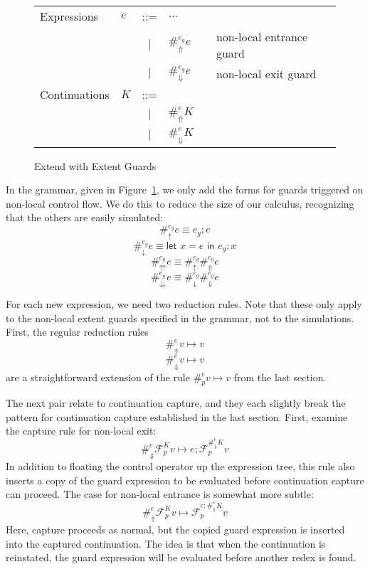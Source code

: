 \documentclass[11pt]{article}
\newcommand{\letin}[2]{\textsf{let }#1\textsf{ in }#2}
\newcommand\F{\mathcal{F}}
\begin{document}
\begin{figure}[H]
\caption{Extend with Extent Guards}
\label{fig:addGuards}

\begin{tabular}{llclll}
Expressions & $e$ & ::= & $\ldots$ &  \\
& & $|$ & $\#_\Uparrow^{e_g}e$ && non-local entrance guard \\
& & $|$ & $\#_\Downarrow^{e_g}e$ && non-local exit guard \\
Continuations & $K$ & ::= & \\
& & $|$ & $\#_{\Uparrow}^{e}K$ &&  \\
& & $|$ & $\#_{\Downarrow}^{e}K$ &&  \\
\end{tabular}
\end{figure}

In the grammar, given in Figure~\ref{fig:addGuards}, we only add the forms for guards triggered on non-local control flow.
We do this to reduce the size of our calculus, recognizing that the others are easily simulated:
$$\#_\uparrow^{e_g}e \equiv e_g; e$$
$$\#_\downarrow^{e_g}e \equiv \letin{x=e}{e_g; x}$$
$$\#_\upuparrows^{e_g}e \equiv \#_\uparrow^{e_g}\#_\Uparrow^{e_g}e$$
$$\#_\downdownarrows^{e_g}e \equiv \#_\downarrow^{e_g}\#_\Downarrow^{e_g}e$$


For each new expression, we need two reduction rules.
Note that these only apply to the non-local extent guards specified in the grammar, not to the simulations.
First, the regular reduction rules
$$\#_{\Uparrow}^{e}v \mapsto v$$
$$\#_{\Downarrow}^{e}v \mapsto v$$
are a straightforward extension of the rule $\#_{p}^{e}v \mapsto v$ from the last section.

The next pair relate to continuation capture, and they each slightly break the pattern for continuation capture established in the last section.
First, examine the capture rule for non-local exit:
$$\#_{\Downarrow}^{e}\F_p^K v \mapsto e;\F_p^{\#_\Downarrow^{e}K}v$$
In addition to floating the control operator up the expression tree, this rule also inserts a copy of the guard expression to be evaluated before continuation capture can proceed.
The case for non-local entrance is somewhat more subtle:
$$\#_{\Uparrow}^{e}\F_p^K v \mapsto \F_p^{e;\#_\Uparrow^{e}K}v$$
Here, capture proceeds as normal, but the copied guard expression is inserted into the captured continuation.
The idea is that when the continuation is reinstated, the guard expression will be evaluated before another redex is found.
\end{document}
